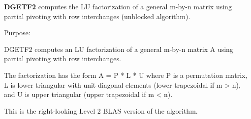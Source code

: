 {\bfseries D\+G\+E\+T\+F2} computes the L\+U factorization of a general m-\/by-\/n matrix using partial pivoting with row interchanges (unblocked algorithm). 

 \begin{DoxyParagraph}{Purpose\+: }
\begin{DoxyVerb} DGETF2 computes an LU factorization of a general m-by-n matrix A
 using partial pivoting with row interchanges.

 The factorization has the form
    A = P * L * U
 where P is a permutation matrix, L is lower triangular with unit
 diagonal elements (lower trapezoidal if m > n), and U is upper
 triangular (upper trapezoidal if m < n).

 This is the right-looking Level 2 BLAS version of the algorithm.\end{DoxyVerb}
 
\end{DoxyParagraph}

